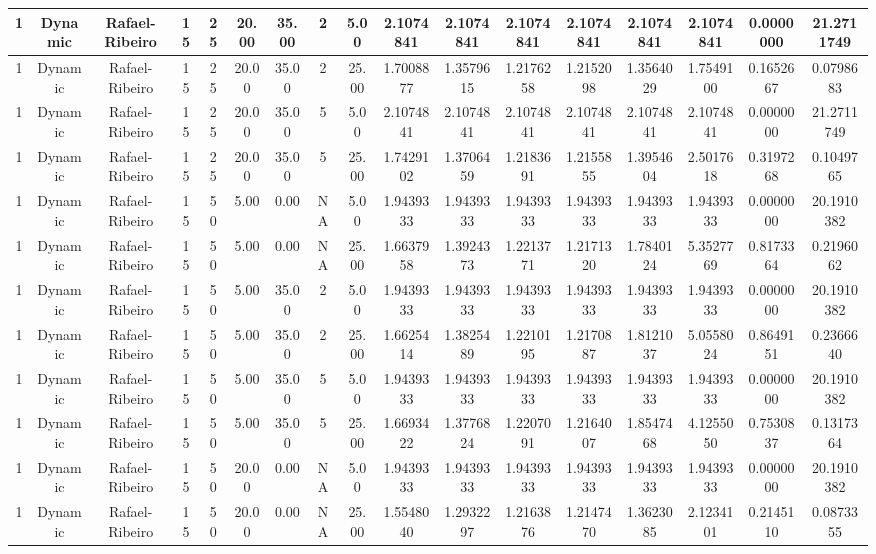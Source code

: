 \documentclass[a4paper]{article}
\begin{document}
\begin{center}
\begin{tabular}{ | c | c | c | c | c | c | c | c | c | c | c | c | c | c | c | c | c | }
		\hline
		1	&	Dynamic	&	Rafael-Ribeiro	&	15	&	25	&	20.00	&	35.00	&	2	&	5.00	&	2.1074841	&	2.1074841	&	2.1074841	&	2.1074841	&	2.1074841	&	2.1074841	&	0.0000000	&	21.2711749 \\
		\hline
		1	&	Dynamic	&	Rafael-Ribeiro	&	15	&	25	&	20.00	&	35.00	&	2	&	25.00	&	1.7008877	&	1.3579615	&	1.2176258	&	1.2152098	&	1.3564029	&	1.7549100	&	0.1652667	&	0.0798683 \\
		\hline
		1	&	Dynamic	&	Rafael-Ribeiro	&	15	&	25	&	20.00	&	35.00	&	5	&	5.00	&	2.1074841	&	2.1074841	&	2.1074841	&	2.1074841	&	2.1074841	&	2.1074841	&	0.0000000	&	21.2711749 \\
		\hline
		1	&	Dynamic	&	Rafael-Ribeiro	&	15	&	25	&	20.00	&	35.00	&	5	&	25.00	&	1.7429102	&	1.3706459	&	1.2183691	&	1.2155855	&	1.3954604	&	2.5017618	&	0.3197268	&	0.1049765 \\
		\hline
		1	&	Dynamic	&	Rafael-Ribeiro	&	15	&	50	&	5.00	&	0.00	&	NA	&	5.00	&	1.9439333	&	1.9439333	&	1.9439333	&	1.9439333	&	1.9439333	&	1.9439333	&	0.0000000	&	20.1910382 \\
		\hline
		1	&	Dynamic	&	Rafael-Ribeiro	&	15	&	50	&	5.00	&	0.00	&	NA	&	25.00	&	1.6637958	&	1.3924373	&	1.2213771	&	1.2171320	&	1.7840124	&	5.3527769	&	0.8173364	&	0.2196062 \\
		\hline
		1	&	Dynamic	&	Rafael-Ribeiro	&	15	&	50	&	5.00	&	35.00	&	2	&	5.00	&	1.9439333	&	1.9439333	&	1.9439333	&	1.9439333	&	1.9439333	&	1.9439333	&	0.0000000	&	20.1910382 \\
		\hline
		1	&	Dynamic	&	Rafael-Ribeiro	&	15	&	50	&	5.00	&	35.00	&	2	&	25.00	&	1.6625414	&	1.3825489	&	1.2210195	&	1.2170887	&	1.8121037	&	5.0558024	&	0.8649151	&	0.2366640 \\
		\hline
		1	&	Dynamic	&	Rafael-Ribeiro	&	15	&	50	&	5.00	&	35.00	&	5	&	5.00	&	1.9439333	&	1.9439333	&	1.9439333	&	1.9439333	&	1.9439333	&	1.9439333	&	0.0000000	&	20.1910382 \\
		\hline
		1	&	Dynamic	&	Rafael-Ribeiro	&	15	&	50	&	5.00	&	35.00	&	5	&	25.00	&	1.6693422	&	1.3776824	&	1.2207091	&	1.2164007	&	1.8547468	&	4.1255050	&	0.7530837	&	0.1317364 \\
		\hline
		1	&	Dynamic	&	Rafael-Ribeiro	&	15	&	50	&	20.00	&	0.00	&	NA	&	5.00	&	1.9439333	&	1.9439333	&	1.9439333	&	1.9439333	&	1.9439333	&	1.9439333	&	0.0000000	&	20.1910382 \\
		\hline
		1	&	Dynamic	&	Rafael-Ribeiro	&	15	&	50	&	20.00	&	0.00	&	NA	&	25.00	&	1.5548040	&	1.2932297	&	1.2163876	&	1.2147470	&	1.3623085	&	2.1234101	&	0.2145110	&	0.0873355 \\
		\hline

\end{tabular}
\end{center}
\end{document}
